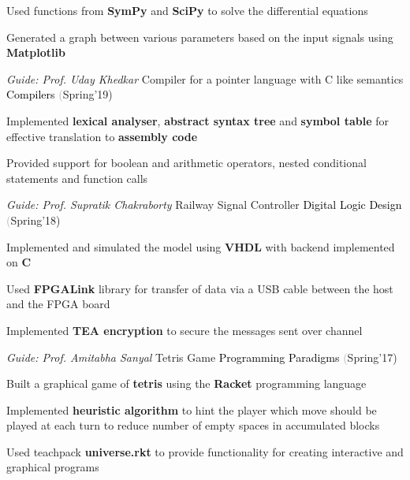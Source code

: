 \begin{cventries}
{\begin{cvitems}
        \item Used functions from \textbf{SymPy} and \textbf{SciPy} to solve the differential equations \vspace{0.3mm}
        \item Generated a graph between various parameters based on the input signals using \textbf{Matplotlib} \vspace{0.3mm}
      \end{cvitems}
    }
  \cventry
    {\textit{Guide: Prof. Uday Khedkar}}
    {Compiler for a pointer language with C like semantics}
    {\textcolor{black} {Compilers}}
    {\fontsize{9pt}{1em} \textcolor{darkgray}(Spring'19)}
    {
      \begin{cvitems}
        \item Implemented \textbf{lexical analyser}, \textbf{abstract syntax tree} and \textbf{symbol table} for effective translation to \textbf{assembly code} \vspace{0.3mm}
        \item Provided support for boolean and arithmetic operators, nested conditional statements and function calls 
      \end{cvitems}
    }
  \cventry
    {\textit{Guide: Prof. Supratik Chakraborty}}
    {Railway Signal Controller}
    {\textcolor{black} {Digital Logic Design}}
    {\fontsize{9pt}{1em} \textcolor{darkgray}(Spring'18)}
    {
      \begin{cvitems}
        \item Implemented and simulated the model using \textbf{VHDL} with backend implemented on \textbf{C} \vspace{0.3mm}
        \item Used \textbf{FPGALink} library for transfer of data via a USB cable between the host and the FPGA board \vspace{0.3mm}
        \item Implemented \textbf{TEA encryption} to secure the messages sent over channel 
      \end{cvitems}
    }
  \cventry
    {\textit{Guide: Prof. Amitabha Sanyal}}
    {Tetris Game}
    {\textcolor{black} {Programming Paradigms}}
    {\fontsize{9pt}{1em} \textcolor{darkgray}(Spring'17)}
    {
      \begin{cvitems}
        \item Built a graphical game of \textbf{tetris} using the \textbf{Racket} programming language \vspace{0.3mm}
        \item Implemented \textbf{heuristic algorithm} to hint the player which move should be played at each turn to reduce
        number of empty spaces in accumulated blocks \vspace{0.3mm}
        \item Used teachpack \textbf{universe.rkt} to provide functionality for creating interactive and graphical programs
      \end{cvitems}
    }
  

\end{cventries}